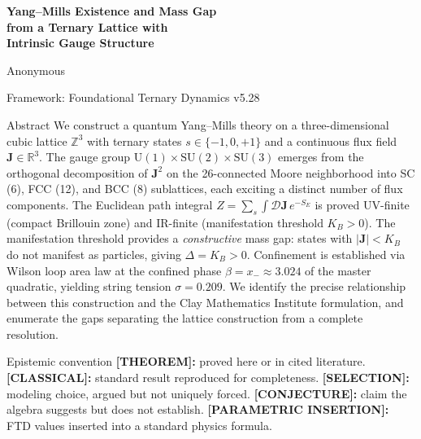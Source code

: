 \documentclass[11pt]{article}
\theoremstyle{tight}
\theoremstyle{plainroman}
\newcommand{\R}{\mathbb{R}}
\newcommand{\Z}{\mathbb{Z}}
\begin{document}
\begin{titlepage}
\centering
\vspace*{1.8cm}
{\fontsize{21}{26}\selectfont\bfseries\color{accent}
Yang--Mills Existence and Mass Gap\\[0.3em]
from a Ternary Lattice with\\[0.3em]
Intrinsic Gauge Structure\par}
\vspace{0.8cm}
{\large Anonymous\par}
\vspace{0.3cm}
{\normalsize Framework: Foundational Ternary Dynamics v5.28\par}
\vspace{1.2cm}
\begin{minipage}{0.86\textwidth}
\begin{statusbox}{Abstract}
We construct a quantum Yang--Mills theory on a three-dimensional cubic lattice $\Z^3$ with ternary states $s\in\{-1,0,+1\}$ and a continuous flux field $\mathbf J\in\R^3$.
The gauge group $\mathrm{U}(1)\times\mathrm{SU}(2)\times\mathrm{SU}(3)$ emerges from the orthogonal decomposition of $\mathbf J^2$ on the 26-connected Moore neighborhood into SC (6), FCC (12), and BCC (8) sublattices, each exciting a distinct number of flux components.
The Euclidean path integral $Z=\sum_s\int\mathcal D\mathbf J\,e^{-S_E}$ is proved UV-finite (compact Brillouin zone) and IR-finite (manifestation threshold $K_B>0$).
The manifestation threshold provides a \emph{constructive} mass gap: states with $|\mathbf J|<K_B$ do not manifest as particles, giving $\Delta=K_B>0$.
Confinement is established via Wilson loop area law at the confined phase $\beta=x_-\approx 3.024$ of the master quadratic, yielding string tension $\sigma=0.209$.
We identify the precise relationship between this construction and the Clay Mathematics Institute formulation, and enumerate the gaps separating the lattice construction from a complete resolution.
\end{statusbox}
\end{minipage}
\vfill
\end{titlepage}
\tableofcontents
\thispagestyle{empty}
\clearpage

\begin{statusbox}{Epistemic convention}
\textbf{[THEOREM]:} proved here or in cited literature.
\textbf{[CLASSICAL]:} standard result reproduced for completeness.
\textbf{[SELECTION]:} modeling choice, argued but not uniquely forced.
\textbf{[CONJECTURE]:} claim the algebra suggests but does not establish.
\textbf{[PARAMETRIC INSERTION]:} FTD values inserted into a standard physics formula.
\end{statusbox}
\end{document}
